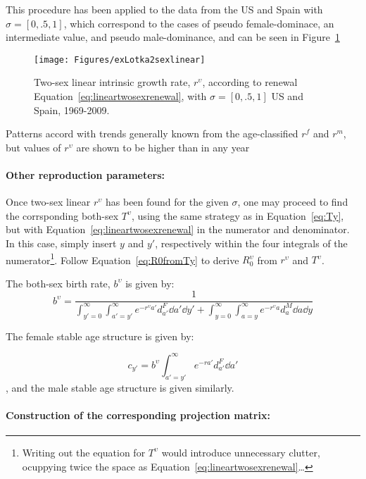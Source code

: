 This procedure has been applied to the data from the US and Spain with $\sigma
= [0,.5,1]$, which correspond to the cases of pseudo female-dominace, an
intermediate value, and pseudo male-dominance, and can be seen in
Figure~\ref{fig:rupsilonlinear2sex}

\begin{figure}[!ht]
  \centering
    \caption{Two-sex linear intrinsic growth rate, $r^\upsilon$, according to
    renewal Equation~\eqref{eq:lineartwosexrenewal}, with $\sigma = [0, .5, 1]$ US 
    and Spain, 1969-2009.}
     \texttt{[image: Figures/exLotka2sexlinear]}
     \label{fig:rupsilonlinear2sex}
\end{figure}

Patterns accord with trends generally known from the age-classified $r^f$ and
$r^m$, but values of $r^\upsilon$ are shown to be higher than in any year

\paragraph{Other reproduction parameters:}

Once two-sex linear $r^\upsilon$ has been found for the given $\sigma$, one may
proceed to find the corrsponding both-sex $T^\upsilon$, using the same strategy as in
Equation~\eqref{eq:Ty}, but with Equation~\eqref{eq:lineartwosexrenewal} in the
numerator and denominator. In this case, simply insert $y$ and $y'$,
respectively within the four integrals of the numerator\footnote{Writing out the
equation for $T^\upsilon$ would introduce unnecessary clutter, ocuppying twice the space as
Equation~\eqref{eq:lineartwosexrenewal}\ldots}. Follow
Equation~\eqref{eq:R0fromTy} to derive $R_0^\upsilon$ from $r^\upsilon$ and
$T^\upsilon$.

The both-sex birth rate, $b^\upsilon$ is given by:
\begin{equation}
b^\upsilon = \frac{1}{
            \int _{y'=0}^\infty \int _{a'=y'}^\infty e^{-r^\upsilon a'}
                      d_{a'}^F \dd a' \dd y' + 
            \int _{y=0}^\infty \int _{a=y}^\infty e^{-r^\upsilon a}
                      d_{a}^M \dd a \dd y}                     
\end{equation}

The female stable age structure is given by:

\begin{equation}
c_{y'} = b^\upsilon \int _{a'=y'}^\infty e^{-ra'} d_{a'}^F \dd a'
\end{equation}
, and the male stable age structure is given similarly.



\paragraph{Construction of the corresponding projection matrix:}

